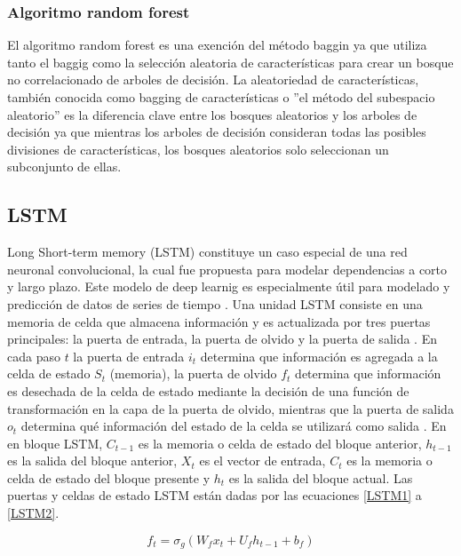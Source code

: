 \subsubsection{Algoritmo random forest}

El algoritmo random forest es una exención del método baggin ya que utiliza tanto el baggig como la selección aleatoria de características para crear un bosque no correlacionado de arboles de decisión.
La aleatoriedad de características, también conocida como bagging de características o ''el método del subespacio aleatorio'' es la diferencia clave entre los bosques aleatorios y los arboles de decisión ya que mientras los arboles de decisión consideran todas las posibles divisiones de características, los bosques aleatorios solo seleccionan un subconjunto de ellas.


\subsection{LSTM}

Long Short-term memory (LSTM) constituye un caso especial de una red neuronal convolucional, la cual fue propuesta para modelar dependencias a corto y largo plazo. Este modelo de deep learnig es especialmente útil para modelado y predicción de datos de series de tiempo \cite{mudassirTimeseriesForecastingBitcoin2020}.
Una unidad LSTM consiste en una memoria de celda que almacena información y es actualizada por tres puertas principales: la puerta de entrada, la puerta de olvido y la puerta de salida \cite{chenBitcoinPricePrediction2020}.
En cada paso $t$ la puerta de entrada $i_t$ determina que información es agregada a la celda de estado $S_t$ (memoria), la puerta de olvido $f_t$ determina que información es desechada de la celda de estado mediante la decisión de una función de transformación en la capa de la puerta de olvido, mientras que la puerta de salida $o_t$ determina qué información del estado de la celda se utilizará como salida \cite{livierisEnsembleDeepLearning2020}.
En en bloque LSTM, $C_{t-1}$ es la memoria o celda de estado del bloque anterior, $h_{t-1}$ es la salida del bloque anterior, $X_t$ es el vector de entrada, $C_t$  es la memoria o celda de estado del bloque presente y  $h_{t}$ es la salida del bloque actual.
Las puertas y celdas de estado LSTM están dadas por las ecuaciones \ref{LSTM1} a \ref{LSTM2}.

\begin{equation}
	f_{t}=\sigma_{g}\left(W_{f} x_{t}+U_{f} h_{t-1}+b_{f}\right)
	\label{LSTM1}
\end{equation}

